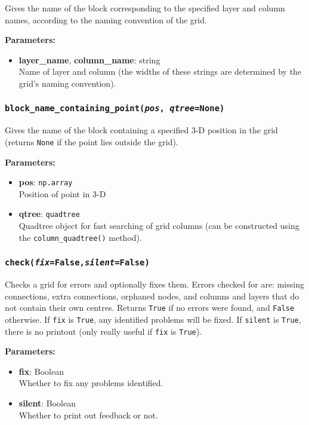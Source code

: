 Gives the name of the block corresponding to the specified layer and column names, according to the naming convention of the grid.

\textbf{Parameters:}
\begin{itemize}
\item \textbf{layer\_name}, \textbf{column\_name}: string\\
  Name of layer and column (the widths of these strings are determined by the grid's naming convention).
\end{itemize}

\subsubsection{\texttt{block\_name\_containing\_point(\emph{pos}, \emph{qtree}=None)}}

Gives the name of the block containing a specified 3-D position in the grid (returns \texttt{None} if the point lies outside the grid).

\textbf{Parameters:}
\begin{itemize}
\item \textbf{pos}: \texttt{np.array}\\
  Position of point in 3-D
\item \textbf{qtree}: \texttt{quadtree}\\
  Quadtree object for fast searching of grid columns (can be constructed using the \texttt{column\_quadtree()} method).
\end{itemize}

\subsubsection{\texttt{check(\emph{fix}=False,\emph{silent}=False)}}

Checks a grid for errors and optionally fixes them.  Errors checked for are: missing connections, extra connections, orphaned nodes, and columns and layers that do not contain their own centres.  Returns \texttt{True} if no errors were found, and \texttt{False} otherwise.  If \texttt{fix} is \texttt{True}, any identified problems will be fixed.  If \texttt{silent} is \texttt{True}, there is no printout (only really useful if \texttt{fix} is \texttt{True}).

\textbf{Parameters:}
\begin{itemize}
\item \textbf{fix}: Boolean\\
  Whether to fix any problems identified.
\item \textbf{silent}: Boolean\\
  Whether to print out feedback or not.
\end{itemize}

